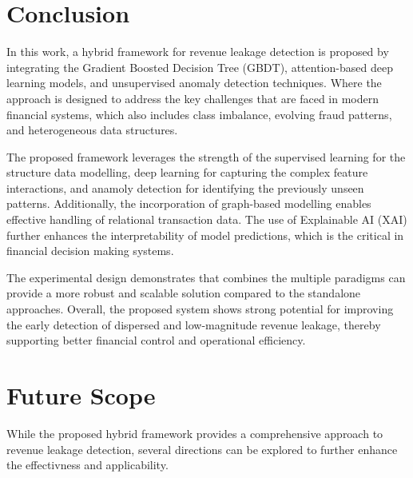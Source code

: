 \documentclass[conference]{IEEEtran}
\begin{document}

\section{Conclusion}

In this work, a hybrid framework for revenue leakage detection is proposed by integrating the Gradient Boosted Decision Tree (GBDT), attention-based deep learning models, and unsupervised anomaly detection techniques. Where the approach is designed to address the key challenges that are faced in modern financial systems, which also includes class imbalance, evolving fraud patterns, and heterogeneous data structures.

The proposed framework leverages the strength of the supervised learning for the structure data modelling, deep learning for capturing the complex feature interactions, and anamoly detection for identifying the previously unseen patterns. Additionally, the incorporation of graph-based modelling enables effective handling of relational transaction data. The use of Explainable AI (XAI) further enhances the interpretability of model predictions, which is the critical in financial decision making systems.


The experimental design demonstrates that combines the multiple paradigms can provide a more robust and scalable solution compared to the standalone approaches. Overall, the proposed system shows strong potential for improving the early detection of dispersed and low-magnitude revenue leakage, thereby supporting better financial control and operational efficiency.




\section{Future Scope}

While the proposed hybrid framework provides a comprehensive approach to revenue leakage detection, several directions can be explored to further enhance the effectivness and applicability.
\end{document}
